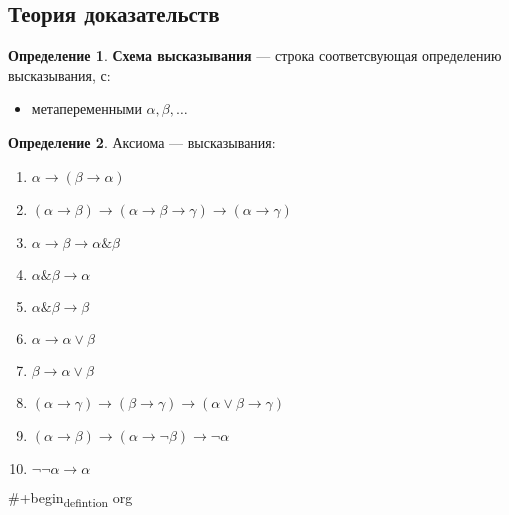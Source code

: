 \documentclass[english]{article}
\theoremstyle{plain}
\theoremstyle{remark}
\theoremstyle{definition}
\newtheorem*{definition}{Определение}
\begin{document}
\subsection{Теория доказательств}
\label{sec:org03419ad}
\begin{definition}
\textbf{Схема высказывания} --- строка соответсвующая определению высказывания, с:
\begin{itemize}
\item метапеременными \(\alpha, \beta, \dots\)
\end{itemize}
\end{definition}
\begin{definition}
Аксиома --- высказывания:
\begin{enumerate}
\item \(\alpha \to (\beta \to \alpha)\)
\item \((\alpha \to \beta) \to (\alpha \to \beta \to \gamma) \to (\alpha \to \gamma)\)
\item \(\alpha \to \beta \to \alpha \& \beta\)
\item \(\alpha \& \beta \to \alpha\)
\item \(\alpha \& \beta \to \beta\)
\item \(\alpha \to \alpha \vee \beta\)
\item \(\beta \to \alpha \vee \beta\)
\item \((\alpha \to \gamma) \to (\beta \to \gamma) \to (\alpha \vee \beta \to \gamma)\)
\item \((\alpha \to \beta) \to (\alpha \to \neg \beta) \to \neg \alpha\)
\item \(\neg\neg \alpha \to \alpha\)
\end{enumerate}
\end{definition}
\#+begin\textsubscript{defintion} org
\end{document}
